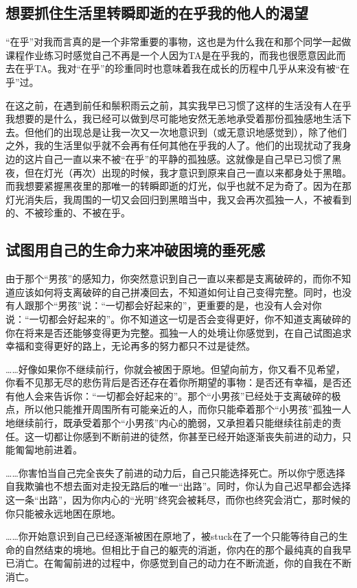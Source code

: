 
\subsection*{想要抓住生活里转瞬即逝的在乎我的他人的渴望}

“在乎”对我而言真的是一个非常重要的事物，这也是为什么我在和那个同学一起做课程作业练习时感觉自己不再是一个人\pozhehao{}因为TA是在乎我的，而我也很愿意因此而去在乎TA。我对“在乎”的珍重同时也意味着我在成长的历程中几乎从来没有被“在乎”过。

在这之前，在遇到前任和鬃积雨云之前，其实我早已习惯了这样的生活\pozhehao{}没有人在乎我想要的是什么，我已经可以做到尽可能地安然无恙地承受着那份孤独感地生活下去。但他们的出现总是让我一次又一次地意识到（或无意识地感觉到），除了他们之外，我的生活里似乎就不会再有任何其他在乎我的人了。他们的出现扰动了我身边的这片自己一直以来不被“在乎”的平静的孤独感。这就像是自己早已习惯了黑夜，但在灯光（再次）出现的时候，我才意识到原来自己一直以来都身处于黑暗。而我想要紧握黑夜里的那唯一的转瞬即逝的灯光，似乎也就不足为奇了。因为在那灯光消失后，我周围的一切又会回归到黑暗当中，我又会再次孤独一人，不被看到的、不被珍重的、不被在乎。


\subsection*{试图用自己的生命力来冲破困境的垂死感}

由于那个“男孩”的感知力，你突然意识到自己一直以来都是支离破碎的，而你不知道应该如何将支离破碎的自己拼凑回去，不知道如何让自己变得完整。同时，也没有人跟那个“男孩”说：“一切都会好起来的”，更重要的是，也没有人会对你说：“一切都会好起来的”。你不知道这一切是否会变得更好，你不知道支离破碎的你在将来是否还能够变得更为完整。孤独一人的处境让你感觉到，在自己试图追求幸福和变得更好的路上，无论再多的努力都只不过是徒然。

……好像如果你不继续前行，你就会被困于原地。但望向前方，你又看不见希望，你看不见那无尽的悲伤背后是否还存在着你所期望的事物：是否还有幸福，是否还有他人会来告诉你：“一切都会好起来的”。那个“小男孩”已经处于支离破碎的极点，所以他只能推开周围所有可能亲近的人，而你只能牵着那个“小男孩”孤独一人地继续前行，既承受着那个“小男孩”内心的脆弱，又承担着只能继续往前走的责任。这一切都让你感到不断前进的徒然，你甚至已经开始逐渐丧失前进的动力，只能匍匐地前进着。

……你害怕当自己完全丧失了前进的动力后，自己只能选择死亡。所以你宁愿选择自我欺骗也不想去面对走投无路后的唯一“出路”。同时，你认为自己迟早都会选择这一条“出路”，因为你内心的“光明”终究会被耗尽，而你也终究会消亡，那时候的你只能被永远地困在原地。

……你开始意识到自己已经逐渐被困在原地了，被stuck在了一个只能等待自己的生命的自然结束的境地。但相比于自己的躯壳的消逝，你内在的那个最纯真的自我早已消亡。在匍匐前进的过程中，你感觉到自己的动力在不断流逝，你的自我在不断消亡。


